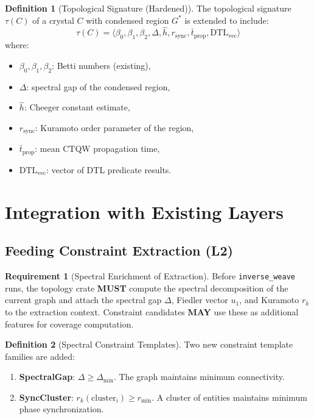 \documentclass[11pt,a4paper,twoside]{article}
\theoremstyle{definition}
\newtheorem{definition}{Definition}[section]
\newtheorem{requirement}{Requirement}[section]
\theoremstyle{plain}
\theoremstyle{remark}
\begin{document}
\begin{definition}[Topological Signature (Hardened)]\label{def:toposig}
The topological signature $\tau(C)$ of a crystal $C$ with condensed
region $G^*$ is extended to include:
\[
  \tau(C) = \langle \beta_0, \beta_1, \beta_2, \Delta, \hat{h},
            r_{\mathrm{sync}}, \bar{t}_{\mathrm{prop}},
            \mathrm{DTL}_{\mathrm{vec}} \rangle
\]
where:
\begin{itemize}[nosep]
  \item $\beta_0, \beta_1, \beta_2$: Betti numbers (existing),
  \item $\Delta$: spectral gap of the condensed region,
  \item $\hat{h}$: Cheeger constant estimate,
  \item $r_{\mathrm{sync}}$: Kuramoto order parameter of the region,
  \item $\bar{t}_{\mathrm{prop}}$: mean CTQW propagation time,
  \item $\mathrm{DTL}_{\mathrm{vec}}$: vector of DTL predicate results.
\end{itemize}
\end{definition}


\section{Integration with Existing Layers}\label{sec:topo:integration}

\subsection{Feeding Constraint Extraction (L2)}

\begin{requirement}[Spectral Enrichment of Extraction]\label{req:specextract}
Before \texttt{inverse\_weave} runs, the topology crate \textbf{MUST}
compute the spectral decomposition of the current graph and attach
the spectral gap $\Delta$, Fiedler vector $u_1$, and Kuramoto $r_k$
to the extraction context. Constraint candidates \textbf{MAY} use
these as additional features for coverage computation.
\end{requirement}

\begin{definition}[Spectral Constraint Templates]\label{def:specconstraint}
Two new constraint template families are added:
\begin{enumerate}[nosep,label=(\roman*)]
  \item \textbf{SpectralGap}: $\Delta \ge \Delta_{\min}$. The graph
        maintains minimum connectivity.
  \item \textbf{SyncCluster}: $r_k(\mathrm{cluster}_i) \ge r_{\min}$.
        A cluster of entities maintains minimum phase synchronization.
\end{enumerate}
\end{definition}
\end{document}
